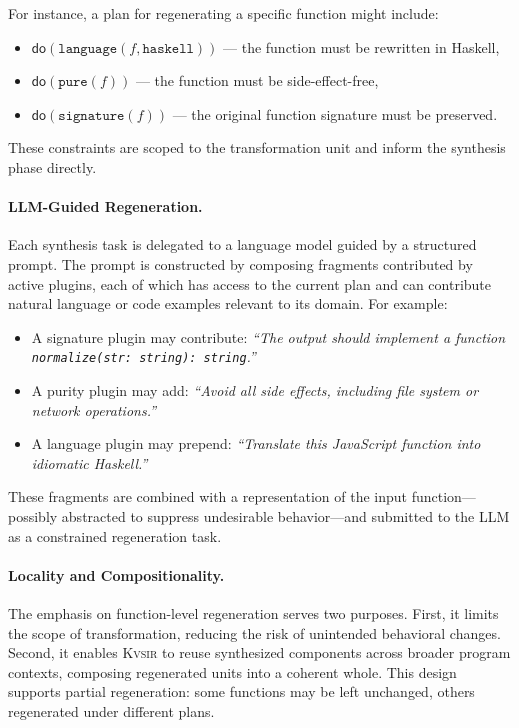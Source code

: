 \documentclass[sigplan]{acmart}
\newcommand{\sys}{{\scshape Kv{\textalpha}sir}\xspace}
\begin{document}
For instance, a plan for regenerating a specific function might include:
\begin{itemize}
  \item $\mathsf{do}(\texttt{language}(f, \texttt{haskell}))$ — the function must be rewritten in Haskell,
  \item $\mathsf{do}(\texttt{pure}(f))$ — the function must be side-effect-free,
  \item $\mathsf{do}(\texttt{signature}(f))$ — the original function signature must be preserved.
\end{itemize}
These constraints are scoped to the transformation unit and inform the synthesis phase directly.

\paragraph{LLM-Guided Regeneration.}
Each synthesis task is delegated to a language model guided by a structured prompt. The prompt is constructed by composing fragments contributed by active plugins, each of which has access to the current plan and can contribute natural language or code examples relevant to its domain. For example:
\begin{itemize}
  \item A signature plugin may contribute: \emph{“The output should implement a function \texttt{normalize(str: string): string}.”}
  \item A purity plugin may add: \emph{“Avoid all side effects, including file system or network operations.”}
  \item A language plugin may prepend: \emph{“Translate this JavaScript function into idiomatic Haskell.”}
\end{itemize}

These fragments are combined with a representation of the input function—possibly abstracted to suppress undesirable behavior—and submitted to the LLM as a constrained regeneration task.

\paragraph{Locality and Compositionality.}
The emphasis on function-level regeneration serves two purposes. First, it limits the scope of transformation, reducing the risk of unintended behavioral changes. Second, it enables \sys to reuse synthesized components across broader program contexts, composing regenerated units into a coherent whole. This design supports partial regeneration: some functions may be left unchanged, others regenerated under different plans.
\end{document}
